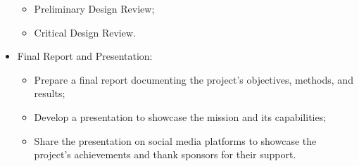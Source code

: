 \documentclass[11pt]{article}
\begin{document}
\begin{itemize}[leftmargin=1cm, itemindent=0.25cm, noitemsep, topsep=0pt, label=$\bullet$]
\begin{itemize}[label=, noitemsep, topsep=0pt]
        \item Preliminary Design Review;
        \item Critical Design Review.
    \end{itemize}
    \item Final Report and Presentation:
    \begin{itemize}[label=, noitemsep, topsep=0pt]
    \item Prepare a final report documenting the project's objectives, methods, and results;
    \item Develop a presentation to showcase the mission and its capabilities;
    \item Share the presentation on social media platforms to showcase the project's achievements and thank sponsors for their support.
    \end{itemize}
\end{itemize}

\newpage






\end{document}

